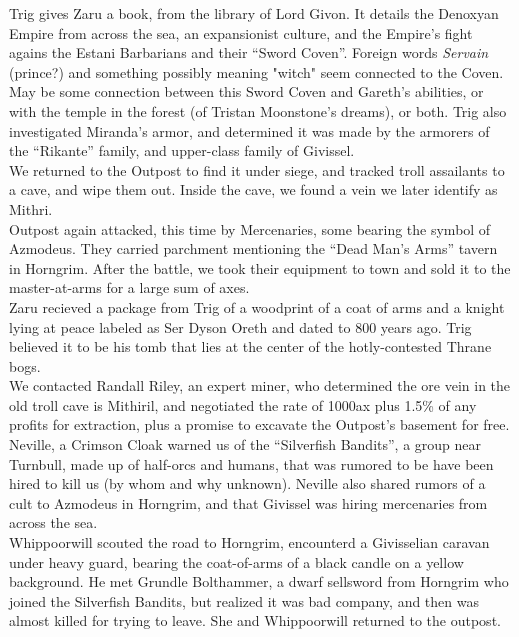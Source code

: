 \documentclass[letterpaper]{article}
\begin{document}
\noindent Trig gives Zaru a book, from the library of Lord Givon.  It details the Denoxyan Empire from across the sea, an expansionist culture, and the Empire's fight agains the Estani Barbarians and their ``Sword Coven''. Foreign words \emph{Servain} (prince?) and something possibly meaning "witch" seem connected to the Coven.  May be some connection between this Sword Coven and Gareth's abilities, or with the temple in the forest (of Tristan Moonstone's dreams), or both.  Trig also investigated Miranda's armor, and determined it was made by the armorers of the ``Rikante'' family, and upper-class family of Givissel.\\

\noindent We returned to the Outpost to find it under siege, and tracked troll assailants to a cave, and wipe them out. Inside the cave, we found a vein we later identify as Mithri.\\

\noindent Outpost again attacked, this time by Mercenaries, some bearing the symbol of Azmodeus.  They carried parchment mentioning the ``Dead Man's Arms'' tavern in Horngrim.  After the battle, we took their equipment to town and sold it to the master-at-arms for a large sum of axes.\\

\noindent Zaru recieved a package from Trig of a woodprint of a coat of arms and a knight lying at peace labeled as Ser Dyson Oreth and dated to 800 years ago.  Trig believed it to be his tomb that lies at the center of the hotly-contested Thrane bogs.\\

\noindent We contacted Randall Riley, an expert miner, who determined the ore vein in the old troll cave is Mithiril, and negotiated the rate of 1000ax plus 1.5\% of any profits for extraction, plus a promise to excavate the Outpost's basement for free.\\

\noindent Neville, a Crimson Cloak warned us of the ``Silverfish Bandits'', a group near Turnbull, made up of half-orcs and humans, that was rumored to be have been hired to kill us (by whom and why unknown). Neville also shared rumors of a cult to Azmodeus in Horngrim, and that Givissel was hiring mercenaries from across the sea.\\

\noindent Whippoorwill scouted the road to Horngrim, encounterd a Givisselian caravan under heavy guard, bearing the coat-of-arms of a black candle on a yellow background.  He met Grundle Bolthammer, a dwarf sellsword from Horngrim who joined the Silverfish Bandits, but realized it was bad company, and then was almost killed for trying to leave. She and Whippoorwill returned to the outpost.\\
\end{document}
